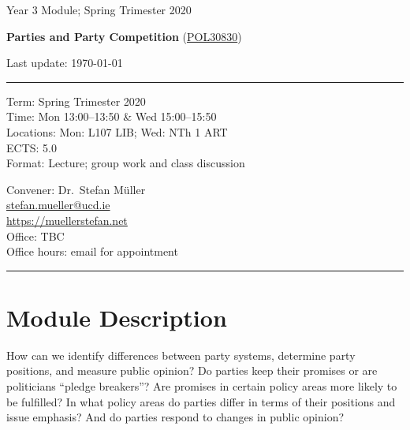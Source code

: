 \documentclass[abstract=on,parskip=full,headings=standardclasses,fontsize=11pt,paper=a4]{scrartcl}
\begin{document}
\singlespacing
\vspace{1cm}

\begin{center}
{\large Year 3 Module; 
Spring Trimester 2020} \\ 
\bigskip

{\Large \textbf{Parties and Party Competition} (\href{https://sisweb.ucd.ie/usis/!W_HU_MENU.P_PUBLISH?p_tag=MODULE&MODULE=POL30830}{POL30830})} 
\bigskip


{\large  {Last update: \today}}\\
\bigskip

\end{center}

\vspace{1.5cm}



\hrule
\medskip
\begin{minipage}[t]{0.5\textwidth}
Term: Spring Trimester 2020 \\
Time: Mon 13:00--13:50 \& Wed 15:00--15:50 \\
Locations:  Mon: L107 LIB; Wed: NTh 1 ART  \\
ECTS: 5.0 \\
Format: Lecture; group work and class discussion
\end{minipage}
\begin{minipage}[t]{0.49\textwidth}
\begin{flushright}
Convener: Dr.\ Stefan Müller \\
 \href{mailto:stefan.mueller@ucd.ie}{\textsf{stefan.mueller@ucd.ie}} \\
 \url{https://muellerstefan.net} \\
Office:  TBC \\
Office hours: email for appointment
\end{flushright}
\end{minipage}
\medskip
\hrule 

\section*{Module Description}

How can we  identify differences between party systems, determine party positions, and measure public opinion?  
Do parties keep their promises or are politicians ``pledge breakers''? Are promises in certain policy areas more likely to be fulfilled? In what policy areas do parties differ in terms of their positions and issue emphasis? And do parties respond to changes in public opinion?  
\end{document}
